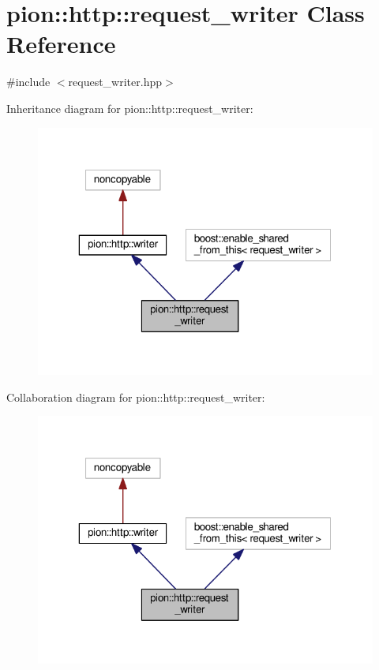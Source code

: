 \hypertarget{classpion_1_1http_1_1request__writer}{\section{pion\-:\-:http\-:\-:request\-\_\-writer Class Reference}
\label{classpion_1_1http_1_1request__writer}
}


{\ttfamily \#include $<$request\-\_\-writer.\-hpp$>$}



Inheritance diagram for pion\-:\-:http\-:\-:request\-\_\-writer\-:
\nopagebreak
\begin{figure}[H]
\begin{center}
\leavevmode
\includegraphics[width=319pt]{classpion_1_1http_1_1request__writer__inherit__graph}
\end{center}
\end{figure}


Collaboration diagram for pion\-:\-:http\-:\-:request\-\_\-writer\-:
\nopagebreak
\begin{figure}[H]
\begin{center}
\leavevmode
\includegraphics[width=319pt]{classpion_1_1http_1_1request__writer__coll__graph}
\end{center}
\end{figure}
